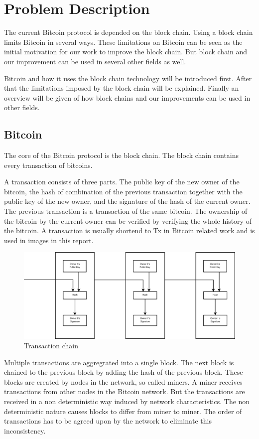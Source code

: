 \chapter{Problem Description}

The current Bitcoin protocol is depended on the block chain. 
Using a block chain limits Bitcoin in several ways.
These limitations on Bitcoin can be seen as the initial motivation 
for our work to improve the block chain.
But block chain and our improvement can be used in several other fields as well.

Bitcoin and how it uses the block chain technology will be introduced first.
After that the limitations imposed by the block chain will be explained.
Finally an overview will be given of how block chains and our improvements can be used in other fields.

\section{Bitcoin}
The core of the Bitcoin protocol is the block chain.
The block chain contains every transaction of bitcoins.

A transaction consists of three parts.
The public key of the new owner of the bitcoin,
the hash of combination of the previous transaction together with the public key of the new owner,
and the signature of the hash of the current owner.
The previous transaction is a transaction of the same bitcoin.
The ownership of the bitcoin by the current owner can be verified
by verifying the whole history of the bitcoin.
A transaction is usually shortend to Tx in Bitcoin related work and is used in images in this report.

\begin{figure}[H]
	\centerline{\includegraphics[scale=0.3]{problemDescription/figs/transactions.eps}}
	\caption{Transaction chain}
\end{figure}

Multiple transactions are aggregrated into a single block.
The next block is chained to the previous block by adding the hash of the previous block.
These blocks are created by nodes in the network, so called miners.
A miner receives transactions from other nodes in the Bitcoin network.
But the transactions are received in a non deterministic way induced by network characteristics.
The non deterministic nature causes blocks to differ from miner to miner.
The order of transactions has to be agreed upon by the network to eliminate this inconsistency.

